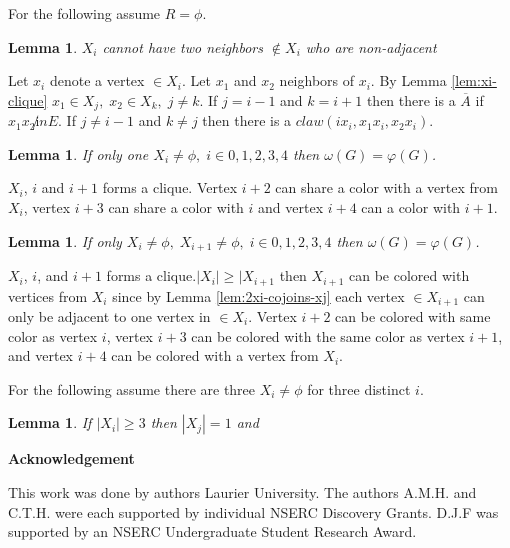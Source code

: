 \documentclass[12pt]{article}
\newtheorem{Lemma}[Theorem]{Lemma}
\begin{document}
For the following assume $R = \phi$. 

\begin{Lemma}\label{lem:xi-neighbor-adjacent}
$X_i$ cannot have two neighbors $\not \in X_i$ who are non-adjacent
\end{Lemma}
 Let $x_i$ denote a vertex $\in X_i$. Let $x_1$ and $x_2$ neighbors of $x_i$. By Lemma \ref{lem:xi-clique} $x_1 \in X_j,\; x_2 \in X_k,\; j \neq k$. If $j=i-1$ and $k=i+1$ then there is a $\overline{A}$ if $x_1x_2 \not in E$. If $j \neq i-1$ and $k \neq j$ then there is a $claw (ix_i, x_1x_i,x_2x_i)$.

\begin{Lemma}\label{lem:one-clique}
If only one $X_i \neq \phi,\; i \in {0, 1, 2, 3, 4}$ then $\omega(G) = \varphi(G)$.
\end{Lemma}
 $X_i$, $i$ and $i+1$ forms a clique. Vertex $i+2$ can share a color with a vertex from $X_i$, vertex $i+3$ can share a color with $i$ and vertex $i+4$ can a color with $i+1$.

\begin{Lemma}\label{lem:xi-xi2-clique}
If only $X_i \neq \phi,\; X_{i+1} \neq \phi,\; i \in {0, 1, 2, 3, 4}$ then $\omega(G) = \varphi(G)$.
\end{Lemma}
 $X_i$, $i$, and $i+1$ forms a clique.$|X_i| \geq |X_{i+1}$ then $X_{i+1}$ can be colored with vertices from $X_i$ since by Lemma \ref{lem:2xi-cojoins-xj} each vertex $\in X_{i+1}$ can only be adjacent to one vertex in $\in X_{i}$. Vertex $i+2$ can be colored with same color as vertex $i$, vertex $i+3$ can be colored with the same color as vertex $i+1$, and vertex $i+4$ can be colored with a vertex from $X_i$.

For the following assume there are three $X_i \neq \phi$ for three distinct $i$.

\begin{Lemma}\label{lem:xi-xi2-xi3-clique}
If $|X_i| \geq 3$ then $|X_j| = 1$ and 
\end{Lemma}

\begin{center}
{\bf Acknowledgement}
\end{center}
This work was done by authors  Laurier University. The authors A.M.H. and C.T.H. were each supported by individual NSERC Discovery Grants. D.J.F was supported by an NSERC Undergraduate Student Research Award.


\clearpage
\begin{thebibliography}{99}

\end{thebibliography}
\end{document}
